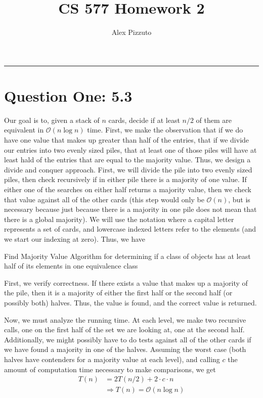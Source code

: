 \documentclass[11pt,letterpaper]{article}
\author{Alex Pizzuto}
\title{CS 577 Homework 2}
\begin{document}
\date{}
\maketitle
\hrule

\section*{Question One: 5.3}
Our goal is to, given a stack of $n$ cards, decide if at least $n/2$ of them are equivalent in $\mathcal{O}(n \log n)$ time. First, we make the observation that if we do have one value that makes up greater than half of the entries, that if we divide our entries into two evenly sized piles, that at least one of those piles will have at least hald of the entries that are equal to the majority value. Thus, we design a divide and conquer approach. First, we will divide the pile into two evenly sized piles, then check recursively if in either pile there is a majority of one value. If either one of the searches on either half returns a majority value, then we check that value against all of the other cards (this step would only be $\mathcal{O}(n)$, but is necessary because just because there is a majority in one pile does not mean that there is a global majority). We will use the notation where a capital letter represents a set of cards, and lowercase indexed letters refer to the elements (and we start our indexing at zero). Thus, we have
\begin{algorithm}
	
\caption{Find Majority Value Algorithm for determining if a class of objects has at least half of its elements in one equivalence class}
\end{algorithm}
First, we verify correctness. If there exists a value that makes up a majority of the pile, then it is a majority of either the first half or the second half (or possibly both) halves. Thus, the value is found, and the correct value is returned.

Now, we must analyze the running time. At each level, we make two recursive calls, one on the first half of the set we are looking at, one at the second half. Additionally, we might possibly have to do tests against all of the other cards if we have found a majority in one of the halves. Assuming the worst case (both halves have contenders for a majority value at each level), and calling $c$ the amount of computation time necessary to make comparisons, we get 
\begin{align*}
	T(n) &= 2T(n/2) + 2\cdot c \cdot n \\
	&\Rightarrow T(n) = \mathcal{O}(n \log n)
\end{align*}
\end{document}
